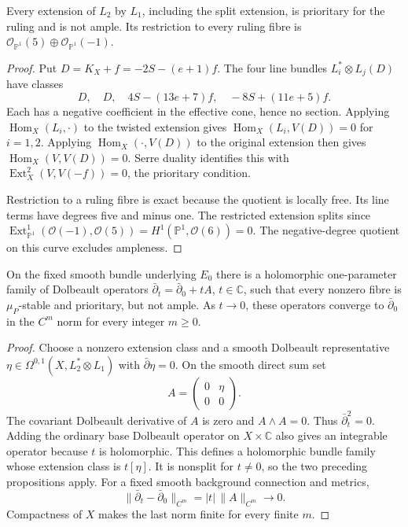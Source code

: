 \begin{proposition}\label{prop:hirzebruch-extension-prioritary}
Every extension of $L_2$ by $L_1$, including the split extension, is
prioritary for the ruling and is not ample. Its restriction to every
ruling fibre is $\mathcal O_{\mathbb P^1}(5)\oplus
\mathcal O_{\mathbb P^1}(-1)$.
\end{proposition}
\begin{proof}
Put $D=K_X+f=-2S-(e+1)f$. The four line bundles
$L_i^*\otimes L_j(D)$ have classes
\[
 D,\quad D,\quad 4S-(13e+7)f,\quad -8S+(11e+5)f.
\]
Each has a negative coefficient in the effective cone, hence no section.
Applying $\operatorname{Hom}_X(L_i,\cdot)$ to the twisted extension gives
$\operatorname{Hom}_X(L_i,V(D))=0$ for $i=1,2$. Applying
$\operatorname{Hom}_X(\cdot,V(D))$ to the original extension then gives
$\operatorname{Hom}_X(V,V(D))=0$. Serre duality identifies this with
$\operatorname{Ext}^2_X(V,V(-f))=0$, the prioritary condition.

Restriction to a ruling fibre is exact because the quotient is locally
free. Its line terms have degrees five and minus one. The restricted
extension splits since
$\operatorname{Ext}^1_{\mathbb P^1}(\mathcal O(-1),\mathcal O(5))
=H^1(\mathbb P^1,\mathcal O(6))=0$.
The negative-degree quotient on this curve excludes ampleness.
\end{proof}

\begin{proposition}\label{prop:hirzebruch-explicit-stable-degeneration}
On the fixed smooth bundle underlying $E_0$ there is a holomorphic
one-parameter family of Dolbeault operators
$\bar\partial_t=\bar\partial_0+tA$, $t\in\mathbb C$, such that every
nonzero fibre is $\mu_P$-stable and prioritary, but not ample.
As $t\to0$, these operators converge to $\bar\partial_0$ in the
$C^m$ norm for every integer $m\geq0$.
\end{proposition}
\begin{proof}
Choose a nonzero extension class and a smooth Dolbeault representative
$\eta\in\Omega^{0,1}(X,L_2^*\otimes L_1)$ with
$\bar\partial\eta=0$. On the smooth direct sum set
\[
 A=\begin{pmatrix}0&\eta\\0&0\end{pmatrix}.
\]
The covariant Dolbeault derivative of $A$ is zero and $A\wedge A=0$.
Thus $\bar\partial_t^2=0$. Adding the ordinary base Dolbeault operator
on $X\times\mathbb C$ also gives an integrable operator because $t$ is
holomorphic. This defines a holomorphic bundle family whose extension
class is $t[\eta]$. It is nonsplit for $t\neq0$, so the two preceding
propositions apply. For a fixed smooth background connection and metrics,
\[
 \|\bar\partial_t-\bar\partial_0\|_{C^m}
 =|t|\,\|A\|_{C^m}\longrightarrow0.
\]
Compactness of $X$ makes the last norm finite for every finite $m$.
\end{proof}

